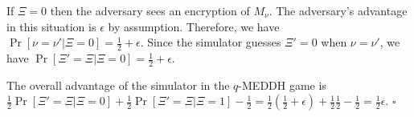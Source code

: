 \documentclass[a4paper, 11pt]{article}
\newenvironment{proof}{\par\noindent{\bf Proof.}}{$\square$\par\bigskip}
\theoremstyle{definition}
\begin{document}
\begin{proof}
If $\Xi=0$ then the adversary sees an encryption of $M_\nu$. The
adversary's advantage in this situation is $\epsilon$ by assumption.
Therefore, we have $\Pr[\nu=\nu'|\Xi=0]=\frac{1}{2}+\epsilon$.
Since the simulator guesses $\Xi'=0$ when $\nu=\nu'$, we have
$\Pr[\Xi'=\Xi|\Xi=0]=\frac{1}{2}+\epsilon$.

The overall advantage of the simulator in the $q$-MEDDH game is
$\frac{1}{2}\Pr[\Xi'=\Xi|\Xi=0]+\frac{1}{2}\Pr[\Xi'=\Xi|\Xi=1]-\frac{1}{2}=\frac{1}{2}(\frac{1}{2}+\epsilon)+\frac{1}{2}\frac{1}{2}-\frac{1}{2}=\frac{1}{2}\epsilon$.
\end{proof}
\end{document}
